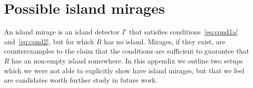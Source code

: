 \documentclass[a4paper,11pt]{article}
\newcommand{\cts}[1]{\ignorespaces}
\begin{document}
\section{Possible island mirages} \label{sec:Mirages}


An island mirage is an island detector $I'$ that satisfies conditions~\eqref{eq:cond1a} and~\eqref{eq:cond2}, but for which $R$ has no island. Mirages, if they exist, are counterexamples to the claim that the conditions are sufficient to guarantee that $R$ has an non-empty island somewhere. In this appendix we outline two setups which we were not able to explicitly show have island mirages, but that we feel are candidates worth further study in future work. 

\end{document}
